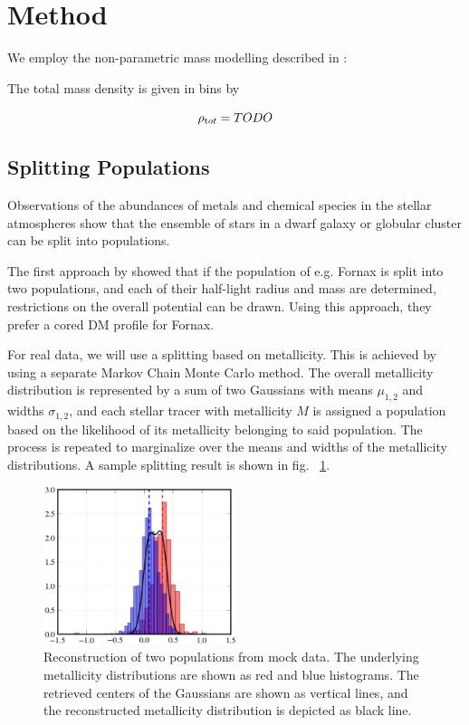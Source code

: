 \section{Method}\label{sec:method}
We employ the non-parametric mass modelling described in
\citep{Steger+2014}:

The total mass density is given in bins by

\begin{equation}
    \rho_{\text tot} = TODO
\end{equation}


\subsection{Splitting Populations}\label{sec:metals}
Observations of the abundances of metals and chemical species in the
stellar atmospheres show that the ensemble of stars in a dwarf galaxy
or globular cluster can be split into populations.

The first approach by \cite{WalkerPenarrubia2011} showed that if the
population of e.g. Fornax is split into two populations, and each of
their half-light radius and mass are determined, restrictions on the
overall potential can be drawn. Using this approach, they prefer a
cored DM profile for Fornax.

For real data, we will use a splitting based on metallicity. This is
achieved by using a separate Markov Chain Monte Carlo method. The
overall metallicity distribution is represented by a sum of two
Gaussians with means $\mu_{1,2}$ and widths $\sigma_{1,2}$, and each
stellar tracer with metallicity $M$ is assigned a population based on
the likelihood of its metallicity belonging to said population. The
process is repeated to marginalize over the means and widths of the
metallicity distributions. A sample splitting result is shown in
fig. ~\ref{fig:pymcmetal}.

\begin{figure}
    \begin{center}
        \includegraphics[width=0.5\textwidth]{fig/pymcmetals}
        \caption{Reconstruction of two populations from mock data. The
          underlying metallicity distributions are shown as red and
          blue histograms. The retrieved centers of the Gaussians are
          shown as vertical lines, and the reconstructed metallicity
          distribution is depicted as black line.}
        \label{fig:pymcmetal}
    \end{center}
\end{figure}


